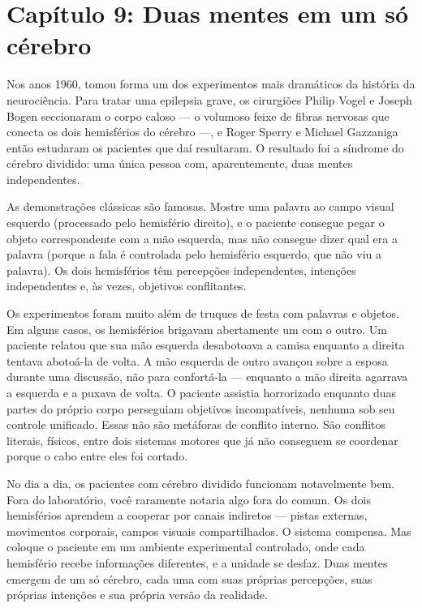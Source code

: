 \documentclass[11pt, twoside, openright]{book}
\begin{document}
\chapter*{Capítulo 9: Duas mentes em um só cérebro}

Nos anos 1960, tomou forma um dos experimentos mais dramáticos da história da neurociência. Para tratar uma epilepsia grave, os cirurgiões Philip Vogel e Joseph Bogen seccionaram o corpo caloso --- o volumoso feixe de fibras nervosas que conecta os dois hemisférios do cérebro ---, e Roger Sperry e Michael Gazzaniga então estudaram os pacientes que daí resultaram. O resultado foi a síndrome do cérebro dividido: uma única pessoa com, aparentemente, duas mentes independentes.

As demonstrações clássicas são famosas. Mostre uma palavra ao campo visual esquerdo (processado pelo hemisfério direito), e o paciente consegue pegar o objeto correspondente com a mão esquerda, mas não consegue dizer qual era a palavra (porque a fala é controlada pelo hemisfério esquerdo, que não viu a palavra). Os dois hemisférios têm percepções independentes, intenções independentes e, às vezes, objetivos conflitantes.

Os experimentos foram muito além de truques de festa com palavras e objetos. Em alguns casos, os hemisférios brigavam abertamente um com o outro. Um paciente relatou que sua mão esquerda desabotoava a camisa enquanto a direita tentava abotoá-la de volta. A mão esquerda de outro avançou sobre a esposa durante uma discussão, não para confortá-la --- enquanto a mão direita agarrava a esquerda e a puxava de volta. O paciente assistia horrorizado enquanto duas partes do próprio corpo perseguiam objetivos incompatíveis, nenhuma sob seu controle unificado. Essas não são metáforas de conflito interno. São conflitos literais, físicos, entre dois sistemas motores que já não conseguem se coordenar porque o cabo entre eles foi cortado.

No dia a dia, os pacientes com cérebro dividido funcionam notavelmente bem. Fora do laboratório, você raramente notaria algo fora do comum. Os dois hemisférios aprendem a cooperar por canais indiretos --- pistas externas, movimentos corporais, campos visuais compartilhados. O sistema compensa. Mas coloque o paciente em um ambiente experimental controlado, onde cada hemisfério recebe informações diferentes, e a unidade se desfaz. Duas mentes emergem de um só cérebro, cada uma com suas próprias percepções, suas próprias intenções e sua própria versão da realidade.
\end{document}
